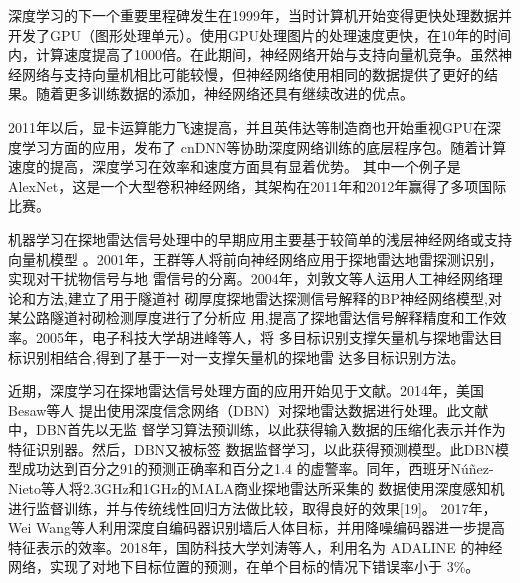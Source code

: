 深度学习的下一个重要里程碑发生在1999年，当时计算机开始变得更快处理数据并开发了GPU（图形处理单元）。使用GPU处理图片的处理速度更快，在10年的时间内，计算速度提高了1000倍。在此期间，神经网络开始与支持向量机竞争。虽然神经网络与支持向量机相比可能较慢，但神经网络使用相同的数据提供了更好的结果。随着更多训练数据的添加，神经网络还具有继续改进的优点。



2011年以后，显卡运算能力飞速提高，并且英伟达等制造商也开始重视GPU在深度学习方面的应用，发布了
cnDNN等协助深度网络训练的底层程序包。随着计算速度的提高，深度学习在效率和速度方面具有显着优势。
其中一个例子是AlexNet，这是一个大型卷积神经网络，其架构在2011年和2012年赢得了多项国际比赛。

机器学习在探地雷达信号处理中的早期应用主要基于较简单的浅层神经网络或支持向量机模型
。2001年，王群等人将前向神经网络应用于探地雷达地雷探测识别，实现对干扰物信号与地
雷信号的分离。2004年，刘敦文等人运用人工神经网络理论和方法,建立了用于隧道衬
砌厚度探地雷达探测信号解释的BP神经网络模型,对某公路隧道衬砌检测厚度进行了分析应
用,提高了探地雷达信号解释精度和工作效率。2005年，电子科技大学胡进峰等人，将
多目标识别支撑矢量机与探地雷达目标识别相结合,得到了基于一对一支撑矢量机的探地雷
达多目标识别方法。

近期，深度学习在探地雷达信号处理方面的应用开始见于文献。2014年，美国Besaw等人
提出使用深度信念网络（DBN）对探地雷达数据进行处理。此文献中，DBN首先以无监
督学习算法预训练，以此获得输入数据的压缩化表示并作为特征识别器。然后，DBN又被标签
数据监督学习，以此获得预测模型。此DBN模型成功达到百分之91的预测正确率和百分之1.4
的虚警率。同年，西班牙Núñez-Nieto等人将2.3GHz和1GHz的MALA商业探地雷达所采集的
数据使用深度感知机进行监督训练，并与传统线性回归方法做比较，取得良好的效果[19]。
2017年，Wei Wang等人利用深度自编码器识别墙后人体目标，并用降噪编码器进一步提高
特征表示的效率。2018年，国防科技大学刘涛等人，利用名为
ADALINE 的神经网络，实现了对地下目标位置的预测，在单个目标的情况下错误率小于
3\%。

